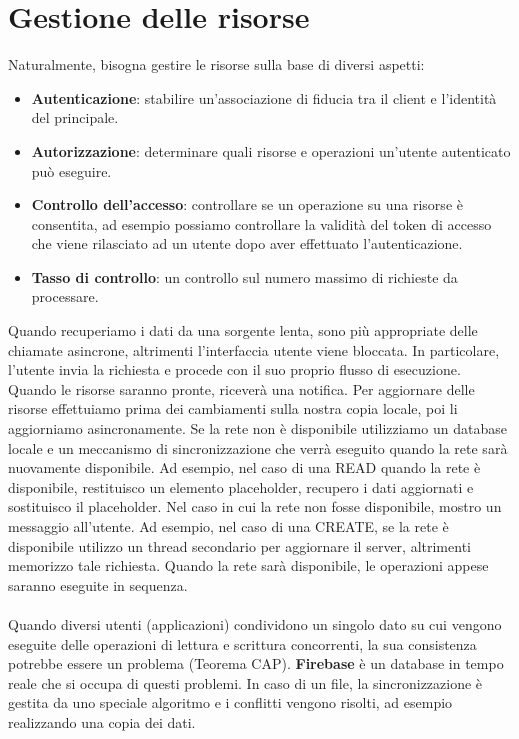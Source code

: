 \section{Gestione delle risorse}
Naturalmente, bisogna gestire le risorse sulla base di diversi aspetti:
\begin{itemize}
\item \textbf{Autenticazione}: stabilire un'associazione di fiducia tra il client e l'identità del principale.
\item \textbf{Autorizzazione}: determinare quali risorse e operazioni un'utente autenticato può eseguire.
\item \textbf{Controllo dell'accesso}: controllare se un operazione su una risorse è consentita, ad esempio possiamo controllare la validità del token di accesso che viene rilasciato ad un utente dopo aver effettuato l'autenticazione.
\item \textbf{Tasso di controllo}: un controllo sul numero massimo di richieste da processare.
\end{itemize}
Quando recuperiamo i dati da una sorgente lenta, sono più appropriate delle chiamate asincrone, altrimenti l'interfaccia utente viene bloccata. In particolare, l'utente invia la richiesta e procede con il suo proprio flusso di esecuzione. Quando le risorse saranno pronte, riceverà una notifica. Per aggiornare delle risorse effettuiamo prima dei cambiamenti sulla nostra copia locale, poi li aggiorniamo asincronamente. Se la rete non è disponibile utilizziamo un database locale e un meccanismo di sincronizzazione che verrà eseguito quando la rete sarà nuovamente disponibile. Ad esempio, nel caso di una READ quando la rete è disponibile, restituisco un elemento placeholder, recupero i dati aggiornati e sostituisco il placeholder. Nel caso in cui la rete non fosse disponibile, mostro un messaggio all'utente. Ad esempio, nel caso di una CREATE, se la rete è disponibile utilizzo un thread secondario per aggiornare il server, altrimenti memorizzo tale richiesta. Quando la rete sarà disponibile, le operazioni appese saranno eseguite in sequenza.\\\\Quando diversi utenti (applicazioni) condividono un singolo dato su cui vengono eseguite delle operazioni di lettura e scrittura concorrenti, la sua consistenza potrebbe essere un problema (Teorema CAP). \textbf{Firebase} è un database in tempo reale che si occupa di questi problemi. In caso di un file, la sincronizzazione è gestita da uno speciale algoritmo e i conflitti vengono risolti, ad esempio realizzando una copia dei dati.
